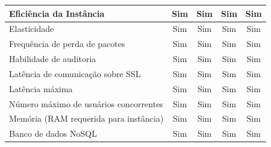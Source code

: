 \documentclass[conference]{IEEEtran}
\begin{document}
\begin{table}[]
\begin{tabular}{|l|c|c|c|c|}
Eficiência da Instância                                        & Sim                         & Sim                                                & Sim                                                & Sim                                              \\ \hline
Elasticidade                                                   & Sim                         & Sim                                                & Sim                                                & Sim                                              \\ \hline
Frequência de perda de pacotes                                 & Sim                         & Sim                                                & Sim                                                & Sim                                              \\ \hline
Habilidade de auditoria                                        & Sim                         & Sim                                                & Sim                                                & Sim                                              \\ \hline
Latência de comunicação sobre SSL                              & Sim                         & Sim                                                & Sim                                                & Sim                                              \\ \hline
Latência máxima                                                & Sim                         & Sim                                                & Sim                                                & Sim                                              \\ \hline
Número máximo de usuários concorrentes                         & Sim                         & Sim                                                & Sim                                                & Sim                                              \\ \hline
Memória (RAM requerida para instância)                         & Sim                         & Sim                                                & Sim                                                & Sim                                              \\ \hline
Banco de dados NoSQL                                           & Sim                         & Sim                                                & Sim                                                & Sim                                              \\ \hline

\end{tabular}
\end{table}
\end{document}
